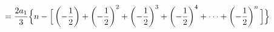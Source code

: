 \documentclass[preview]{standalone}
\begin{document}
\begin{align*}
\special{dvisvgm:raw <g id='unique000'>}=\frac{2a_1}{3}\Big\{n-\Big[\left(-\frac{1}{2}\right)+\left(-\frac{1}{2}\right)^2+\left(-\frac{1}{2}\right)^3+\left(-\frac{1}{2}\right)^4+\cdots+\left(-\frac{1}{2}\right)^n\Big]\Big\}\special{dvisvgm:raw </g>}
\end{align*}
\end{document}
